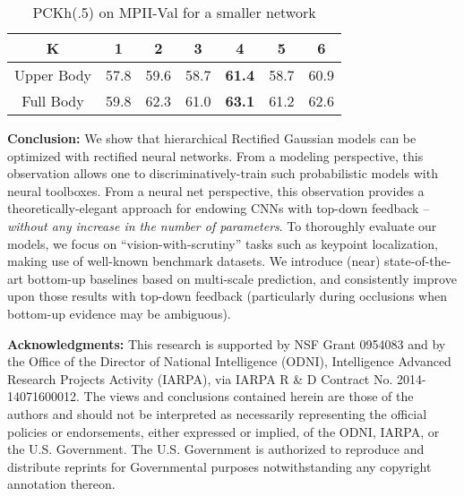 \documentclass[10pt,twocolumn,letterpaper]{article}
\begin{document}
\renewcommand{\tabcolsep}{2pt}
\begin{table}[t!]
  \centering
    \begin{tabular}{|c|c|c|c|c|c|c|}
      \hline 
      K          & 1    & 2    & 3    & 4             & 5    & 6    \\ 
      \hline 
      Upper Body & 57.8 & 59.6 & 58.7 & {\bf 61.4} & 58.7 & 60.9 \\ 
      \hline 
      Full Body  & 59.8 & 62.3 & 61.0 & {\bf 63.1} & 61.2 & 62.6 \\ 
      \hline 
    \end{tabular}
\caption{ PCKh(.5) on MPII-Val for a smaller network } 
  \label{fig:mpii-small}
\end{table}



{\bf Conclusion:} We show that hierarchical Rectified Gaussian models
can be optimized with rectified neural networks. From a modeling
perspective, this observation allows one to discriminatively-train
such probabilistic models with neural toolboxes. From a neural net
perspective, this observation provides a theoretically-elegant
approach for endowing CNNs with top-down feedback -- {\em without any
  increase in the number of parameters}. To thoroughly evaluate our
models, we focus on ``vision-with-scrutiny'' tasks such as keypoint
localization, making use of well-known benchmark datasets. We
introduce (near) state-of-the-art bottom-up baselines based on
multi-scale prediction, and consistently improve upon those results
with top-down feedback (particularly during occlusions when bottom-up
evidence may be ambiguous).

{\bf Acknowledgments:} This research is supported by NSF
Grant 0954083 and by the Office of the Director
of National Intelligence (ODNI), Intelligence Advanced Research
Projects Activity (IARPA), via IARPA R \& D Contract
No. 2014-14071600012. The views and conclusions contained herein are
those of the authors and should not be interpreted as necessarily
representing the official policies or endorsements, either expressed
or implied, of the ODNI, IARPA, or the U.S. Government. The
U.S. Government is authorized to reproduce and distribute reprints for
Governmental purposes notwithstanding any copyright annotation
thereon.



{\small
  
  
}
\end{document}
